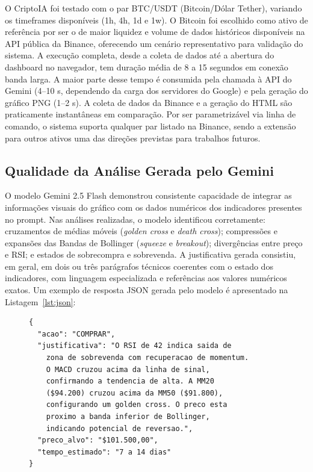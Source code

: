 \documentclass[conference]{IEEEtran}
\begin{document}
O CriptoIA foi testado com o par BTC/USDT (Bitcoin/Dólar Tether), variando os timeframes disponíveis (1h, 4h, 1d e 1w). O Bitcoin foi escolhido como ativo de referência por ser o de maior liquidez e volume de dados históricos disponíveis na API pública da Binance, oferecendo um cenário representativo para validação do sistema. A execução completa, desde a coleta de dados até a abertura do dashboard no navegador, tem duração média de 8 a 15 segundos em conexão banda larga. A maior parte desse tempo é consumida pela chamada à API do Gemini (4--10 s, dependendo da carga dos servidores do Google) e pela geração do gráfico PNG (1--2 s). A coleta de dados da Binance e a geração do HTML são praticamente instantâneas em comparação. Por ser parametrizável via linha de comando, o sistema suporta qualquer par listado na Binance, sendo a extensão para outros ativos uma das direções previstas para trabalhos futuros.


\subsection{Qualidade da Análise Gerada pelo Gemini}

O modelo Gemini 2.5 Flash demonstrou consistente capacidade de integrar as informações visuais do gráfico com os dados numéricos dos indicadores presentes no prompt. Nas análises realizadas, o modelo identificou corretamente: cruzamentos de médias móveis (\textit{golden cross} e \textit{death cross}); compressões e expansões das Bandas de Bollinger (\textit{squeeze} e \textit{breakout}); divergências entre preço e RSI; e estados de sobrecompra e sobrevenda. A justificativa gerada consistiu, em geral, em dois ou três parágrafos técnicos coerentes com o estado dos indicadores, com linguagem especializada e referências aos valores numéricos exatos. Um exemplo de resposta JSON gerada pelo modelo é apresentado na Listagem~\ref{lst:json}:

\begin{figure}[H]
\begin{lstlisting}[language={},caption={Exemplo de resposta JSON do Gemini.},label={lst:json}]
{
  "acao": "COMPRAR",
  "justificativa": "O RSI de 42 indica saida de
    zona de sobrevenda com recuperacao de momentum.
    O MACD cruzou acima da linha de sinal,
    confirmando a tendencia de alta. A MM20
    ($94.200) cruzou acima da MM50 ($91.800),
    configurando um golden cross. O preco esta
    proximo a banda inferior de Bollinger,
    indicando potencial de reversao.",
  "preco_alvo": "$101.500,00",
  "tempo_estimado": "7 a 14 dias"
}
\end{lstlisting}
\end{figure}
\end{document}

